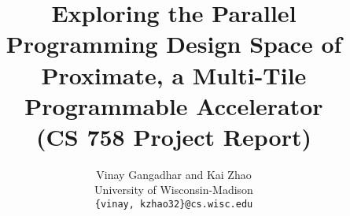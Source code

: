 \documentclass[10pt]{article}
\title{{Exploring the Parallel Programming Design Space of \\
        Proximate, a Multi-Tile Programmable Accelerator}\\ 
        { \normalsize (CS 758 Project Report)}}
\author{Vinay Gangadhar and Kai Zhao \\University of Wisconsin-Madison\\{\tt \{vinay, kzhao32\}@cs.wisc.edu}}
\date{}
\begin{document}
\maketitle

\doublespacing









%





\singlespace


\end{document}

